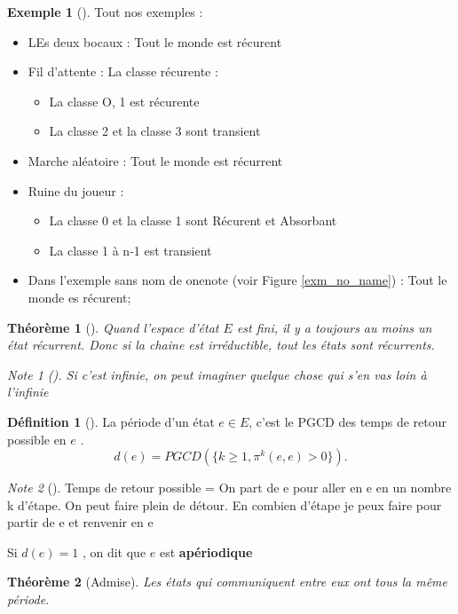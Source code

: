 \documentclass{article}
\theoremstyle{plain}%
\newtheorem{thm}{Théorème}[section]
\theoremstyle{definition}
\newtheorem{defn}{Définition}[section]
\newtheorem{exmp}{Exemple}[section]
\theoremstyle{remark}
\newtheorem*{note}{Note}
\begin{document}
\begin{exmp}[]
	Tout nos exemples : \begin{itemize}
		\item LEs deux bocaux : Tout le monde est récurent
		\item Fil d'attente : La classe récurente : \begin{itemize}
			\item La classe O, 1 est récurente
			\item La classe 2 et la classe 3 sont transient 
		\end{itemize}
		\item Marche aléatoire : Tout le monde est récurrent 
		\item Ruine du joueur : \begin{itemize}
			\item La classe 0 et la classe 1 sont Récurent et Absorbant
			\item La classe 1 à n-1 est transient
		\end{itemize}
		\item Dans l'exemple sans nom de onenote (voir Figure \ref{exm_no_name}) : Tout le monde es récurent;

	\end{itemize}
\end{exmp}

\begin{thm}[]
	Quand l'espace d'état $ E $ est fini, il y a toujours au moins un état récurrent. Donc si la chaine est irréductible, tout les états sont récurrents.
	\begin{note}[]
		Si c'est infinie, on peut imaginer quelque chose qui s'en vas loin à l'infinie
	\end{note}
\end{thm}

\begin{defn}[]
	La période d'un état $ e \in E $, c'est le PGCD des temps de retour possible en $ e $ . 
	\[
		d(e) = PGCD(\{k \geq 1, \pi ^k (e,e) > 0\})
	.\]
	\begin{note}[]
		Temps de retour possible = On part de e pour aller en e en un nombre k d'étape. On peut faire plein de détour.
		En combien d'étape je peux faire pour partir de e et renvenir en e
	\end{note}
	Si $ d(e) = 1 $ , on dit que $ e $ est \textbf{apériodique}	 
\end{defn}

\begin{thm}[Admise]
	Les états qui communiquent entre eux ont tous la même période.
\end{thm}
\end{document}
